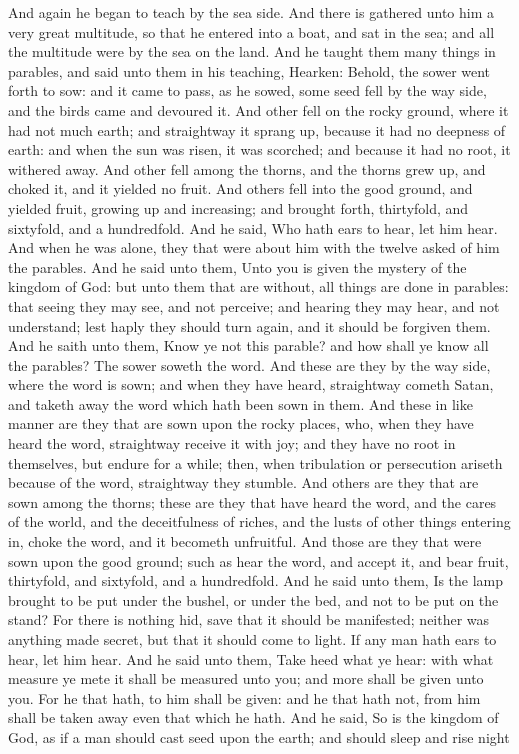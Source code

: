 And again he began to teach by the sea side. And there is gathered unto him a very great multitude, so that he entered into a boat, and sat in the sea; and all the multitude were by the sea on the land. And he taught them many things in parables, and said unto them in his teaching, Hearken: Behold, the sower went forth to sow: and it came to pass, as he sowed, some seed fell by the way side, and the birds came and devoured it. And other fell on the rocky ground, where it had not much earth; and straightway it sprang up, because it had no deepness of earth: and when the sun was risen, it was scorched; and because it had no root, it withered away. And other fell among the thorns, and the thorns grew up, and choked it, and it yielded no fruit. And others fell into the good ground, and yielded fruit, growing up and increasing; and brought forth, thirtyfold, and sixtyfold, and a hundredfold. And he said, Who hath ears to hear, let him hear.  And when he was alone, they that were about him with the twelve asked of him the parables. And he said unto them, Unto you is given the mystery of the kingdom of God: but unto them that are without, all things are done in parables: that seeing they may see, and not perceive; and hearing they may hear, and not understand; lest haply they should turn again, and it should be forgiven them. And he saith unto them, Know ye not this parable? and how shall ye know all the parables? The sower soweth the word. And these are they by the way side, where the word is sown; and when they have heard, straightway cometh Satan, and taketh away the word which hath been sown in them. And these in like manner are they that are sown upon the rocky places, who, when they have heard the word, straightway receive it with joy; and they have no root in themselves, but endure for a while; then, when tribulation or persecution ariseth because of the word, straightway they stumble. And others are they that are sown among the thorns; these are they that have heard the word, and the cares of the world, and the deceitfulness of riches, and the lusts of other things entering in, choke the word, and it becometh unfruitful. And those are they that were sown upon the good ground; such as hear the word, and accept it, and bear fruit, thirtyfold, and sixtyfold, and a hundredfold.  And he said unto them, Is the lamp brought to be put under the bushel, or under the bed, and not to be put on the stand? For there is nothing hid, save that it should be manifested; neither was anything made secret, but that it should come to light. If any man hath ears to hear, let him hear. And he said unto them, Take heed what ye hear: with what measure ye mete it shall be measured unto you; and more shall be given unto you. For he that hath, to him shall be given: and he that hath not, from him shall be taken away even that which he hath.  And he said, So is the kingdom of God, as if a man should cast seed upon the earth; and should sleep and rise night 